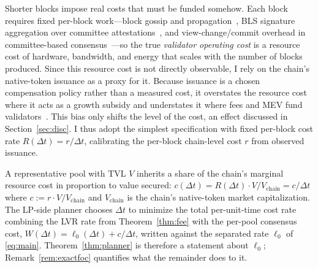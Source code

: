 \documentclass[runningheads]{llncs}
\newcommand{\dt}{\Delta t}
\newcommand{\1}{\mathbf{1}}
\begin{document}
Shorter blocks impose real costs that must be funded somehow. Each block requires fixed per-block work---block gossip and propagation~\cite{decker2013information}, BLS signature aggregation over committee attestations~\cite{buterin2022paths}, and view-change/commit overhead in committee-based consensus~\cite{benhaim2024scaling}---so the true \emph{validator operating cost} is a resource cost of hardware, bandwidth, and energy that scales with the number of blocks produced. Since this resource cost is not directly observable, I rely on the chain's native-token issuance as a proxy for it. Because issuance is a chosen compensation policy rather than a measured cost, it overstates the resource cost where it acts as a growth subsidy and understates it where fees and MEV fund validators~\cite{buterin2022paths,beccuti2025staking}. This bias only shifts the level of the cost, an effect discussed in Section~\ref{sec:disc}. I thus adopt the simplest specification with fixed per-block cost rate $R(\dt) = r/\dt$, calibrating the per-block chain-level cost $r$ from observed issuance.

A representative pool with TVL $V$ inherits a share of the chain's marginal resource cost in proportion to value secured: $c(\dt) = R(\dt) \cdot V/V_{\text{chain}} = c/\dt$ where $c := r \cdot V/V_{\text{chain}}$ and $V_{\text{chain}}$ is the chain's native-token market capitalization. The LP-side planner chooses $\dt$ to minimize the total per-unit-time cost rate combining the LVR rate from Theorem~\ref{thm:fee} with the per-pool consensus cost,
$W(\dt) = \ell_0(\dt) + c/\dt$,
written against the separated rate $\ell_0$ of \eqref{eq:main}. Theorem~\ref{thm:planner} is therefore a statement about $\ell_0$; Remark~\ref{rem:exactfoc} quantifies what the remainder does to it.
\end{document}
